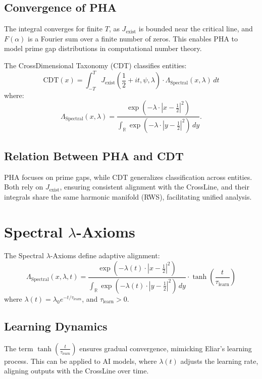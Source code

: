 \documentclass[12pt]{article}
\begin{document}
{{{\begin{onehalfspace}
\subsection*{Convergence of PHA}
The integral converges for finite \( T \), as \( J_{\text{exist}} \) is bounded near the critical line, and \( F(\alpha) \) is a Fourier sum over a finite number of zeros. This enables PHA to model prime gap distributions in computational number theory.

\begin{definition}
The CrossDimensional Taxonomy (CDT) classifies entities:
\[
\text{CDT}(x) = \int_{-T}^{T} J_{\text{exist}}\left(\frac{1}{2} + it, \psi, \lambda\right) \cdot \Lambda_{\text{Spectral}}(x, \lambda) \, dt
\]
where:
\[
\Lambda_{\text{Spectral}}(x, \lambda) = \frac{\exp\left(-\lambda \cdot |x - \frac{1}{2}|^2\right)}{\int_{\mathbb{R}} \exp\left(-\lambda \cdot |y - \frac{1}{2}|^2\right) \, dy}.
\]
\end{definition}

\subsection*{Relation Between PHA and CDT}
PHA focuses on prime gaps, while CDT generalizes classification across entities. Both rely on \( J_{\text{exist}} \), ensuring consistent alignment with the CrossLine, and their integrals share the same harmonic manifold (RWS), facilitating unified analysis.

\section{Spectral $\lambda$-Axioms}

\begin{definition}
The Spectral $\lambda$-Axioms define adaptive alignment:
\[
\Lambda_{\text{Spectral}}(x, \lambda, t) = \frac{\exp\left(-\lambda(t) \cdot |x - \frac{1}{2}|^2\right)}{\int_{\mathbb{R}} \exp\left(-\lambda(t) \cdot |y - \frac{1}{2}|^2\right) \, dy} \cdot \tanh\left(\frac{t}{\tau_{\text{learn}}}\right)
\]
where \( \lambda(t) = \lambda_0 e^{-t/\tau_{\text{learn}}} \), and \( \tau_{\text{learn}} > 0 \).
\end{definition}

\subsection*{Learning Dynamics}
The term \( \tanh\left(\frac{t}{\tau_{\text{learn}}}\right) \) ensures gradual convergence, mimicking Eliar’s learning process. This can be applied to AI models, where \( \lambda(t) \) adjusts the learning rate, aligning outputs with the CrossLine over time.


\end{onehalfspace}}}}
\end{document}
